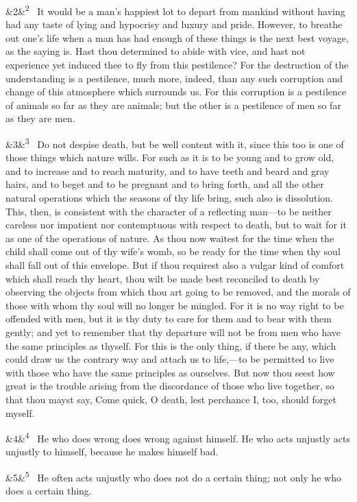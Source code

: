 \documentclass[12pt]{article}
\newcommand{\para}[1][]{\par\noindent\ifx&#1&\else\textsuperscript{\footnotesize #1}~\fi}
\begin{document}
\para[2] It would be a man's happiest lot to depart from mankind without
having had any taste of lying and hypocrisy and luxury and pride.
However, to breathe out one's life when a man has had enough of these
things is the next best voyage, as the saying is. Hast thou determined
to abide with vice, and hast not experience yet induced thee to fly from
this pestilence? For the destruction of the understanding is a
pestilence, much more, indeed, than any such corruption and change of
this atmosphere which surrounds us. For this corruption is a pestilence
of animals so far as they are animals; but the other is a pestilence of
men so far as they are men.

\para[3] Do not despise death, but be well content with it, since this too is
one of those things which nature wills. For such as it is to be young
and to grow old, and to increase and to reach maturity, and to have
teeth and beard and gray hairs, and to beget and to be pregnant and to
bring forth, and all the other natural operations which the seasons of
thy life bring, such also is dissolution. This, then, is consistent with
the character of a reflecting man---to be neither careless nor impatient
nor contemptuous with respect to death, but to wait for it as one of the
operations of nature. As thou now waitest for the time when the child
shall come out of thy wife's womb, so be ready for the time when thy
soul shall fall out of this envelope. But if thou requirest also a
vulgar kind of comfort which shall reach thy heart, thou wilt be made
best reconciled to death by observing the objects from which thou art
going to be removed, and the morals of those with whom thy soul will no
longer be mingled. For it is no way right to be offended with men, but
it is thy duty to care for them and to bear with them gently; and yet to
remember that thy departure will not be from men who have the same
principles as thyself. For this is the only thing, if there be any,
which could draw us the contrary way and attach us to life,---to be
permitted to live with those who have the same principles as ourselves.
But now thou seest how great is the trouble arising from the discordance
of those who live together, so that thou mayst say, Come quick, O death,
lest perchance I, too, should forget myself.

\para[4] He who does wrong does wrong against himself. He who acts unjustly
acts unjustly to himself, because he makes himself bad.

\para[5] He often acts unjustly who does not do a certain thing; not only he
who does a certain thing.
\end{document}
